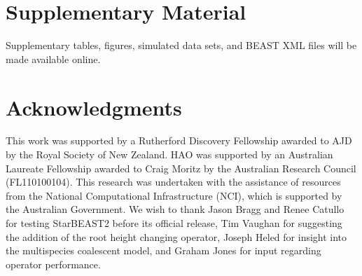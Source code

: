 \documentclass[12pt]{article}
\begin{document}
\section*{Supplementary Material}

Supplementary tables, figures, simulated data sets, and BEAST XML files will be
made available online.

\section*{Acknowledgments}

This work was supported by a Rutherford Discovery Fellowship awarded to AJD by
the Royal Society of New Zealand. HAO was supported by an Australian Laureate
Fellowship awarded to Craig Moritz by the Australian Research Council
(FL110100104). This research was undertaken with the assistance of resources
from the National Computational Infrastructure (NCI), which is supported by the
Australian Government. We wish to thank Jason Bragg and Renee Catullo for
testing StarBEAST2 before its official release, Tim Vaughan for suggesting the
addition of the root height changing operator, Joseph Heled for insight into the
multispecies coalescent model, and Graham Jones for input regarding operator
performance.

\clearpage



\end{document}
